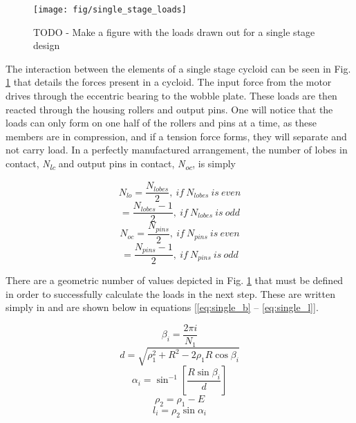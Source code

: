 \begin{figure}[t]
   \centering
   \texttt{[image: fig/single\_stage\_loads]}
   \caption{TODO - Make a figure with the loads drawn out for a single stage design}
   \label{fig:single_loads}
\end{figure}

The interaction between the elements of a single stage cycloid can be seen in Fig. \ref{fig:single_loads} that details the forces present in a cycloid. The input force from the motor drives through the eccentric bearing to the wobble plate. These loads are then reacted through the housing rollers and output pins. One will notice that the loads can only form on one half of the rollers and pins at a time, as these members are in compression, and if a tension force forms, they will separate and not carry load. In a perfectly manufactured arrangement, the number of lobes in contact, \textit{N\textsubscript{lc}} and output pins in contact, \textit{N\textsubscript{oc}}, is simply 

\begin{equation}
N_{lo} = \frac{N_{lobes}}{2},\ if\ N_{lobes}\ is\ even 
\end{equation}
\begin{equation}
= \frac{N_{lobes} - 1}{2},\ if\ N_{lobes}\ is\ odd 
\end{equation}
\begin{equation}
N_{oc} = \frac{N_{pins}}{2},\ if\ N_{pins}\ is\ even 
\end{equation}
\begin{equation}
= \frac{N_{pins} - 1}{2},\ if\ N_{pins}\ is\ odd 
\end{equation}

There are a geometric number of values depicted in Fig. \ref{fig:single_loads} that must be defined in order to successfully calculate the loads in the next step. These are written simply in \cite{hwang_geometry} and are shown below in equations [\ref{eq:single_b} -- \ref{eq:single_l}]. 

\begin{equation} \label{eq:single_b}
\beta_i = \frac{2\pi i}{N_1}
\end{equation}
\begin{equation} \label{eq:single_d}
d = \sqrt{\rho_1^2 + R^2 - 2 \rho_1 R \cos{\beta_i}}
\end{equation}
\begin{equation} \label{eq:single_alpha}
\alpha_i = \sin^{-1}\left[{\frac{R \sin{\beta_i}}{d}}\right]
\end{equation}
\begin{equation} \label{eq:single_rho2}
\rho_2 = \rho_1 - E
\end{equation}
\begin{equation} \label{eq:single_l}
l_i = \rho_2 \sin{\alpha_i}
\end{equation}

